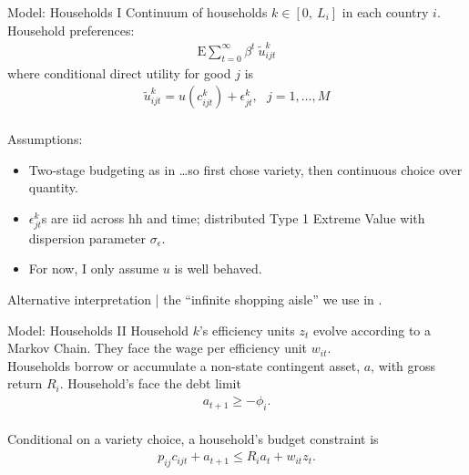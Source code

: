 \documentclass[9pt,pdftex,aspectratio=1610]{beamer}
\theoremstyle{definition}
\begin{document}

\begin{frame}[t]{Model: Households I}
\smallskip
Continuum of households $k \in [0, \ L_i]$ in each country $i$. Household preferences:
\begin{align*}
\mathrm{E}\sum_{t = 0}^{\infty} \beta^{t} \ \tilde{u}^k_{ijt}
\end{align*}
where conditional direct utility for good $j$ is
\begin{align*}
\tilde{u}^k_{ijt} =  u(c^k_{ijt}) + \epsilon^k_{jt}, \ \ \ j = 1, \ldots, M
\end{align*}\\
\medskip
Assumptions:
\begin{itemize}
\item Two-stage budgeting as in \citet*{anderson1987ces}\ldots so first chose variety, then continuous choice over quantity.
\smallskip
\item $\epsilon^k_{jt}$s are iid across hh and time; distributed Type 1 Extreme Value with dispersion parameter $\sigma_{\epsilon}$.
\smallskip
\item For now, I only assume $u$ is well behaved.
\end{itemize}
\medskip
Alternative interpretation | the ``infinite shopping aisle'' we use in \citet{p-iq}.
\end{frame}


\begin{frame}[t]{Model: Households II}
\smallskip
Household $k$'s efficiency units $z_t$ evolve according to a Markov Chain. They face the wage per efficiency unit $w_{it}$.\\
\bigskip
\medskip
Households borrow or accumulate a non-state contingent asset, $a$, with gross return $R_{i}$. Household's face the debt limit
\begin{align*}
a_{t+1} \geq - \phi_{i}.
\end{align*}\\
\bigskip
\medskip
Conditional on a variety choice, a household's budget constraint is
\begin{align*}
p_{ij}c_{ijt} +  a_{t+1} \leq    R_{i} a_{t} + w_{it} z_{t}.
\end{align*}
\end{frame}
\end{document}

